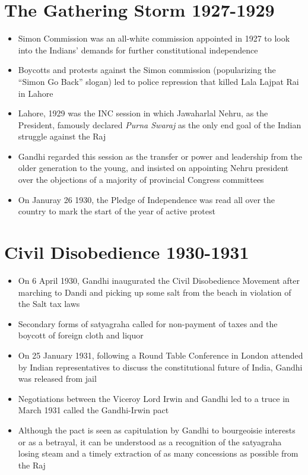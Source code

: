 \section{The Gathering Storm 1927-1929}
\begin{itemize}
    \item Simon Commission was an all-white commission appointed in 1927 to look into the Indians' demands for further constitutional independence
    \item Boycotts and protests against the Simon commission (popularizing the ``Simon Go Back'' slogan) led to police repression that killed Lala Lajpat Rai in Lahore
    \item Lahore, 1929 was the INC session in which Jawaharlal Nehru, as the President, famously declared \textit{Purna Swaraj} as the only end goal of the Indian struggle against the Raj
    \item Gandhi regarded this session as the transfer or power and leadership from the older generation to the young, and insisted on appointing Nehru president over the objections of a majority of provincial Congress committees
    \item On Januray 26 1930, the Pledge of Independence was read all over the country to mark the start of the year of active protest
\end{itemize}

\section{Civil Disobedience 1930-1931}
\begin{itemize}
    \item On 6 April 1930, Gandhi inaugurated the Civil Disobedience Movement after marching to Dandi and picking up some salt from the beach in violation of the Salt tax laws
    \item Secondary forms of satyagraha called for non-payment of taxes and the boycott of foreign cloth and liquor
    \item On 25 January 1931, following a Round Table Conference in London attended by Indian representatives to discuss the constitutional future of India, Gandhi was released from jail
    \item Negotiations between the Viceroy Lord Irwin and Gandhi led to a truce in March 1931 called the Gandhi-Irwin pact
    \item Although the pact is seen as capitulation by Gandhi to bourgeoisie interests or as a betrayal, it can be understood as a recognition of the satyagraha losing steam and a timely extraction of as many concessions as possible from the Raj
\end{itemize}

